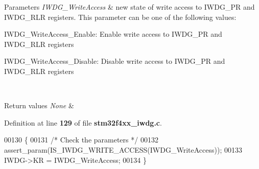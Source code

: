 \begin{DoxyParams}{Parameters}
{\em I\+W\+D\+G\+\_\+\+Write\+Access} & new state of write access to I\+W\+D\+G\+\_\+\+PR and I\+W\+D\+G\+\_\+\+R\+LR registers. This parameter can be one of the following values\+: \begin{DoxyItemize}
\item I\+W\+D\+G\+\_\+\+Write\+Access\+\_\+\+Enable\+: Enable write access to I\+W\+D\+G\+\_\+\+PR and I\+W\+D\+G\+\_\+\+R\+LR registers \item I\+W\+D\+G\+\_\+\+Write\+Access\+\_\+\+Disable\+: Disable write access to I\+W\+D\+G\+\_\+\+PR and I\+W\+D\+G\+\_\+\+R\+LR registers \end{DoxyItemize}
\\
\hline
\end{DoxyParams}

\begin{DoxyRetVals}{Return values}
{\em None} & \\
\hline
\end{DoxyRetVals}


Definition at line \textbf{ 129} of file \textbf{ stm32f4xx\+\_\+iwdg.\+c}.


\begin{DoxyCode}
00130 \{
00131   \textcolor{comment}{/* Check the parameters */}
00132   assert_param(IS_IWDG_WRITE_ACCESS(IWDG\_WriteAccess));
00133   IWDG->KR = IWDG\_WriteAccess;
00134 \}
\end{DoxyCode}
